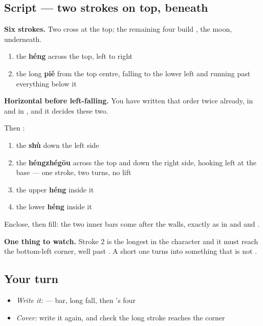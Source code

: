 \subsection*{Script — two strokes on top,  beneath}

\begin{quote}
\end{quote}

\textbf{Six strokes.} Two cross at the top; the remaining four build , the moon, underneath.

\begin{enumerate}
\raggedright
  \item the \textbf{héng} across the top, left to right
  \item the long \textbf{piě} from the top centre, falling to the lower left and running past everything below it
\end{enumerate}

\textbf{Horizontal before left-falling.} You have written that order twice already, in  and in , and it decides these two.

Then :

\begin{enumerate}
\raggedright
  \item the \textbf{shù} down the left side
  \item the \textbf{héngzhégōu} across the top and down the right side, hooking left at the base — one stroke, two turns, no lift
  \item the upper \textbf{héng} inside it
  \item the lower \textbf{héng} inside it
\end{enumerate}

Enclose, then fill: the two inner bars come after the walls, exactly as in  and  and .

\textbf{One thing to watch.} Stroke 2 is the longest in the character and it must reach the bottom-left corner, well past . A short one turns  into something that is not .

\subsection*{Your turn}
\begin{itemize}
\raggedright
  \item \emph{Write it:}  — bar, long fall, then 's four
  \item \emph{Cover:} write it again, and check the long stroke reaches the corner
\end{itemize}

